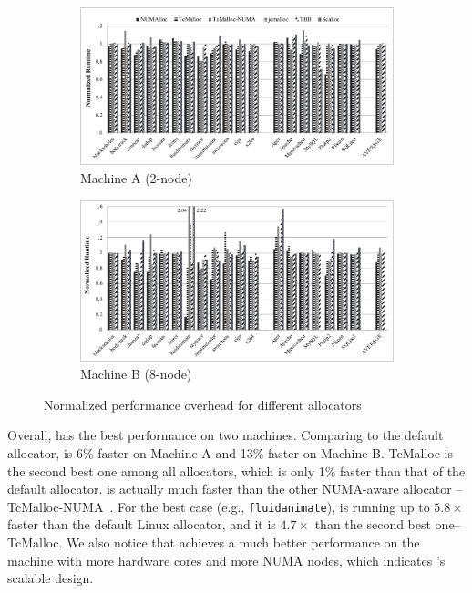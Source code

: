 \begin{figure}[H]
    \centering
    \begin{subfigure}{0.9\textwidth}
    \includegraphics[width=\textwidth]{figure/2-node-parsec-perf.pdf}
    \caption{Machine A (2-node)\label{2node-parsec-perf}}
    \end{subfigure}
    
	\vspace{0.1in}  
	
	\begin{subfigure}{0.9\textwidth}    \includegraphics[width=\textwidth]{figure/8-node-parsec-perf.pdf}
    \caption{Machine B (8-node)\label{8node-parsec-perf}}
    \end{subfigure}
    \caption{Normalized performance overhead for different allocators \label{sec:perf}}
 \end{figure}


Overall, \NM{} has the best performance on two machines. Comparing to the default allocator, \NM{} is 6\% faster on Machine A and 13\% faster on Machine B. TcMalloc is the second best one among all allocators, which is only 1\% faster than that of the default allocator. \NM{} is actually much faster than the other NUMA-aware allocator -- TcMalloc-NUMA~\cite{tcmallocnew}. For the best case (e.g., \texttt{fluidanimate}), \NM{} is running up to  $5.8\times$ faster than the default Linux allocator, and it is $4.7\times$ than the second best one--TcMalloc. We also notice that \NM{} achieves a much better performance on the machine with more hardware cores and more NUMA nodes, which indicates \NM{}'s scalable design. 

